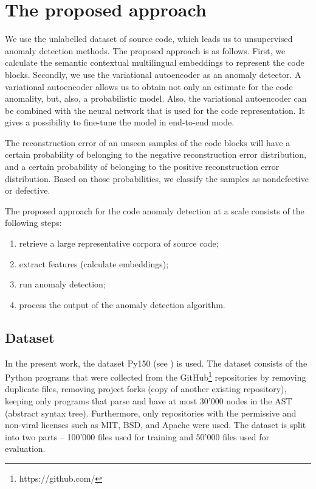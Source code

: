 \documentclass[conference]{ieeetran}
\begin{document}
\section{The proposed approach}\label{approach}

We use the unlabelled dataset of source code, which leads us to unsupervised anomaly detection methods.
The proposed approach is as follows.
First, we calculate the semantic contextual multilingual embeddings to represent the code blocks.
Secondly, we use the variational autoencoder as an anomaly detector.
A variational autoencoder allows us to obtain not only an estimate for the code anomality, but, also, a probabilistic model.
Also, the variational autoencoder can be combined with the neural network that is used for the code representation.
It gives a possibility to fine-tune the model in end-to-end mode.

The reconstruction error of an unseen samples of the code blocks will have a certain probability of belonging to the negative reconstruction error distribution,
 and a certain probability of belonging to the positive reconstruction error distribution.
Based on those probabilities, we classify the samples as nondefective or defective.

The proposed approach for the code anomaly detection at a scale consists of the following steps:
\begin{enumerate}
\item retrieve a large representative corpora of source code;
\item extract features (calculate embeddings);
\item run anomaly detection;
\item process the output of the anomaly detection algorithm. 
\end{enumerate}


\subsection{Dataset}

In the present work, the dataset Py150 (see \cite{RaychevEtAl2016}) is used.
The dataset consists of the Python programs that were collected from the GitHub\footnote{https://github.com/} repositories
 by removing duplicate files, removing project forks (copy of another existing repository),
 keeping only programs that parse and have at most 30'000 nodes in the AST (abstract syntax tree).
Furthermore, only repositories with the permissive and non-viral licenses such as MIT, BSD, and Apache were used.
The dataset is split into two parts -- 100'000 files used for training and 50'000 files used for evaluation. 
\end{document}
